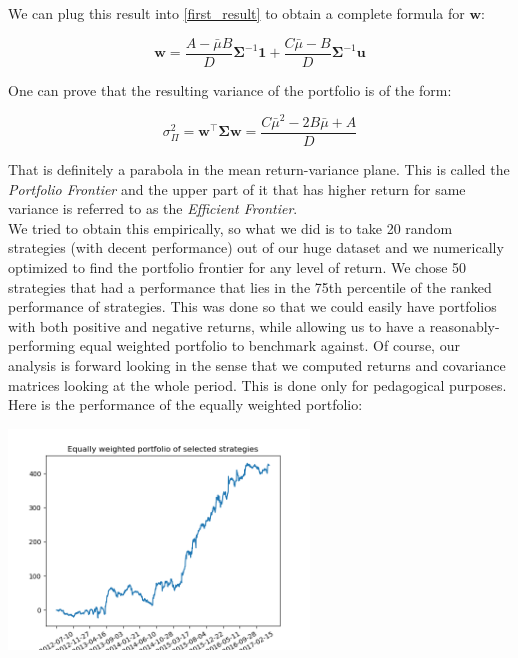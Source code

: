 We can plug this result into \eqref{first_result} to obtain a complete formula for $\mathbf{w}$:

\begin{equation} \label{final_result}
\mathbf{w} = \frac{A - \bar{\mu}B}{D}\mathbf{\Sigma}^{-1}\mathbf{1} + \frac{C\bar{\mu} - B}{D}\mathbf{\Sigma}^{-1}\mathbf{u}
\end{equation}

One can prove that the resulting variance of the portfolio is of the form:

\begin{equation} \label{N_portfolio_variance}
\sigma^2_{\Pi} = \mathbf{w}^\top \mathbf{\Sigma}\mathbf{w} = \frac{C\bar{\mu}^2 - 2B\bar{\mu} + A}{D}
\end{equation}

That is definitely a parabola in the mean return-variance plane. This is called the \textit{Portfolio Frontier} and the upper part of it that has higher return for same variance is referred to as the \textit{Efficient Frontier}.\\
We tried to obtain this empirically, so what we did is to take 20 random strategies (with decent performance) out of our huge dataset and we numerically optimized to find the portfolio frontier for any level of return. We chose 50 strategies that had a performance that lies in the 75th percentile of the ranked performance of strategies. This was done so that we could easily have portfolios with both positive and negative returns, while allowing us to have a reasonably-performing equal weighted portfolio to benchmark against. Of course, our analysis is forward looking in the sense that we computed returns and covariance matrices looking at the whole period. This is done only for pedagogical purposes. Here is the performance of the equally weighted portfolio:

\begin{center}
	\centering
	\includegraphics[width=0.6\textwidth]{Portfolio_Theory/Portfolio_Front_Figure_1.png}
	\label{Equal_Weight_frontier}
\end{center}


